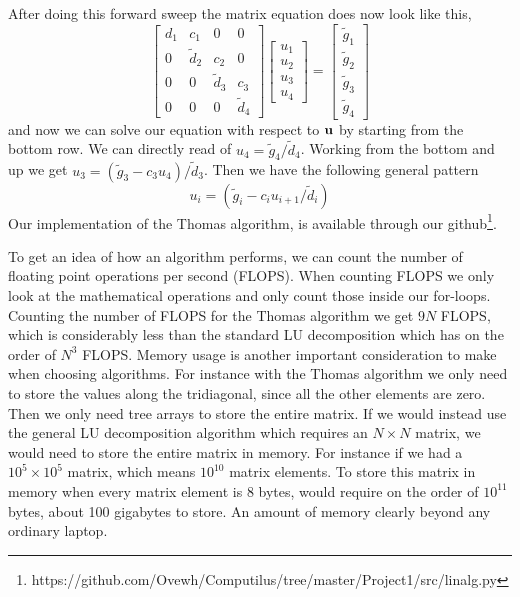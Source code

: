 After doing this forward sweep the matrix equation does now look like this,
\begin{equation*}
  \begin{bmatrix}
    d_1 & c_1 & 0 & 0 \\
    0 & \tilde{d}_2 & c_2 & 0 \\
    0 & 0 & \tilde{d}_3 & c_3  \\
    0 & 0 & 0 & \tilde{d}_4 
  \end{bmatrix} \begin{bmatrix}
    u_1 \\ u_2 \\ u_3 \\ u_4
  \end{bmatrix} = \begin{bmatrix}
    \tilde{g}_1 \\ \tilde{g}_2 \\ \tilde{g}_3 \\ \tilde{g}_4
  \end{bmatrix}
\end{equation*}
and now we can solve our equation with respect to $\mathbf{u}$ by starting from
the bottom row. We can directly read of $u_4 = \tilde{g}_4 / \tilde{d}_4$.
Working from the bottom and up we get $u_3 = \left(\tilde{g}_3-c_3
u_4\right)/\tilde{d}_3$. Then we have the following general pattern
\begin{equation}
  u_i = \left(\tilde{g}_i - c_i u_{i+1}/\tilde{d}_i \right)
\end{equation}  
Our implementation of the Thomas algorithm, is available
through our github\footnote{https://github.com/Ovewh/Computilus/tree/master/Project1/src/linalg.py}.


To get an idea of how an algorithm performs, we can count
the number of floating point operations per second (FLOPS). When counting FLOPS
we only look at the mathematical operations and only count those inside our
for-loops. Counting the number of FLOPS for the Thomas algorithm we get $9N$
FLOPS, which is considerably less than the standard LU decomposition which has
on the order of $N^3$ FLOPS.   
Memory usage is another important consideration to make when choosing
algorithms. For instance with the Thomas algorithm we only need to store the
values along the tridiagonal, since all the other elements are zero. Then we only need tree arrays to store the entire matrix. If we
would instead use the general LU decomposition algorithm which requires an $N
\times N$ matrix, we would need to store the entire matrix in memory. For
instance if we had a $10^5 \times 10^5$ matrix, which means $10^10$ matrix
elements. To store this matrix in memory when
every matrix element is 8 bytes, would require on the order of $10^{11}$
bytes, about 100 gigabytes to store. An amount of memory clearly beyond any
ordinary laptop. 

